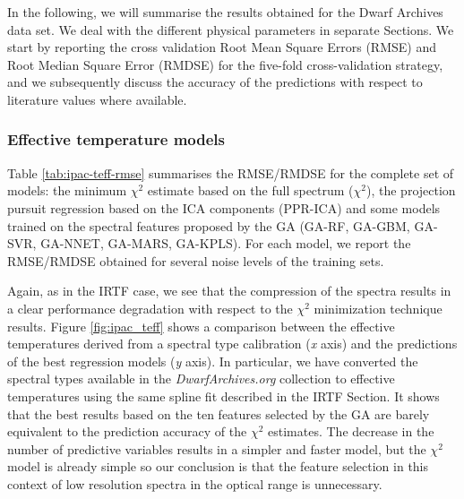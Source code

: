 
In the following, we will summarise the results obtained for the Dwarf Archives
data set. We deal with the different physical parameters in separate
Sections. We start by reporting the cross validation Root Mean Square
Errors (RMSE) and Root Median Square Error (RMDSE) for the five-fold
cross-validation strategy, and we subsequently discuss the accuracy of
the predictions with respect to literature values where available.

\subsubsection{Effective temperature models}

Table \ref{tab:ipac-teff-rmse} summarises the RMSE/RMDSE for the
complete set of models: the minimum $\chi^2$ estimate based on the
full spectrum ($\chi^2$), the projection pursuit regression based on
the ICA components (PPR-ICA) and some models trained on the spectral
features proposed by the GA (GA-RF, GA-GBM, GA-SVR, GA-NNET, GA-MARS,
GA-KPLS). For each model, we report the RMSE/RMDSE obtained for
several noise levels of the training sets.

Again, as in the IRTF case, we see that the compression of the spectra
results in a clear performance degradation with respect to the
$\chi^2$ minimization technique results. Figure \ref{fig:ipac_teff}
shows a comparison between the effective temperatures derived from a
spectral type calibration ({\it x} axis) and the predictions of the
best regression models ({\it y} axis). In particular, we have
converted the spectral types available in the {\it DwarfArchives.org}
collection to effective temperatures using the same spline fit
described in the IRTF Section. It shows that the best results based on
the ten features selected by the GA are barely equivalent to the
prediction accuracy of the $\chi^2$ estimates. The decrease in the
number of predictive variables results in a simpler and faster model,
but the $\chi^2$ model is already simple so our conclusion is that the
feature selection in this context of low resolution spectra in the
optical range is unnecessary.

